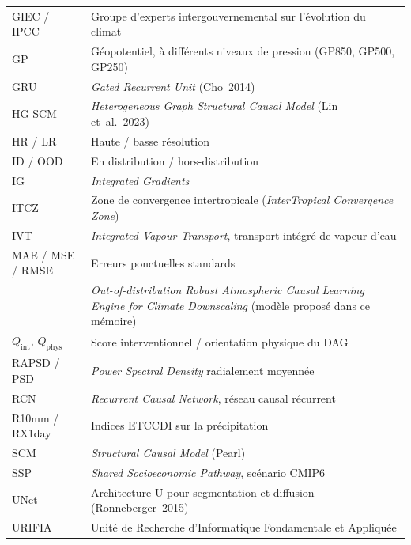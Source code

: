 \begin{longtable}{p{3.8cm} p{10.7cm}}
GIEC / IPCC & Groupe d'experts intergouvernemental sur l'évolution du climat \\[0.3em]
GP & Géopotentiel, à différents niveaux de pression (GP850, GP500, GP250) \\[0.3em]
GRU & \emph{Gated Recurrent Unit} (Cho~2014) \\[0.3em]
HG-SCM & \emph{Heterogeneous Graph Structural Causal Model} (Lin et~al.~2023) \\[0.3em]
HR / LR & Haute / basse résolution \\[0.3em]
ID / OOD & En distribution / hors-distribution \\[0.3em]
IG & \emph{Integrated Gradients} \\[0.3em]
ITCZ & Zone de convergence intertropicale (\emph{InterTropical Convergence Zone}) \\[0.3em]
IVT & \emph{Integrated Vapour Transport}, transport intégré de vapeur d'eau \\[0.3em]
MAE / MSE / RMSE & Erreurs ponctuelles standards \\[0.3em]
\Oracle{} & \emph{Out-of-distribution Robust Atmospheric Causal Learning Engine for Climate Downscaling} (modèle proposé dans ce mémoire) \\[0.3em]
$Q_{\mathrm{int}}$, $Q_{\mathrm{phys}}$ & Score interventionnel / orientation physique du DAG \\[0.3em]
RAPSD / PSD & \emph{Power Spectral Density} radialement moyennée \\[0.3em]
RCN & \emph{Recurrent Causal Network}, réseau causal récurrent \\[0.3em]
R10mm / RX1day & Indices ETCCDI sur la précipitation \\[0.3em]
SCM & \emph{Structural Causal Model} (Pearl) \\[0.3em]
SSP & \emph{Shared Socioeconomic Pathway}, scénario CMIP6 \\[0.3em]
UNet & Architecture U pour segmentation et diffusion (Ronneberger~2015) \\[0.3em]
URIFIA & Unité de Recherche d'Informatique Fondamentale et Appliquée \\
\end{longtable}
\addtocounter{table}{-1}
\endgroup

